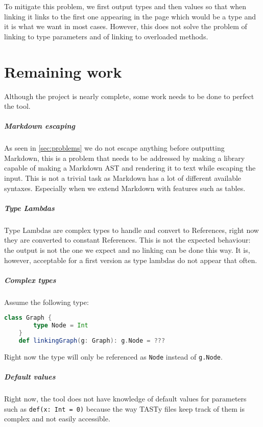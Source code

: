 \documentclass{report}
\begin{document}
To mitigate this problem, we first output types and then values so that when linking it links to the first one appearing in the page which would be a type and it is what we want in most cases. However, this does not solve the problem of linking to type parameters and of linking to overloaded methods.

\chapter{Remaining work}
Although the project is nearly complete, some work needs to be done to perfect the tool.

\paragraph{Markdown escaping}
As seen in \autoref{sec:problems} we do not escape anything before outputting Markdown, this is a problem that needs to be addressed by making a library capable of making a Markdown AST and rendering it to text while escaping the input. This is not a trivial task as Markdown has a lot of different available syntaxes. Especially when we extend Markdown with features such as tables.

\paragraph{Type Lambdas}
Type Lambdas are complex types to handle and convert to References, right now they are converted to constant References. This is not the expected behaviour: the output is not the one we expect and no linking can be done this way. It is, however, acceptable for a first version as type lambdas do not appear that often.

\paragraph{Complex types}
Assume the following type:
\begin{lstlisting}[language=scala]
    class Graph {
        type Node = Int
    }
    def linkingGraph(g: Graph): g.Node = ???    
\end{lstlisting}
Right now the type will only be referenced as \texttt{Node} instead of \texttt{g.Node}.

\paragraph{Default values}
Right now, the tool does not have knowledge of default values for parameters such as \texttt{def(x: Int = 0)} because the way TASTy files keep track of them is complex and not easily accessible.
\end{document}
